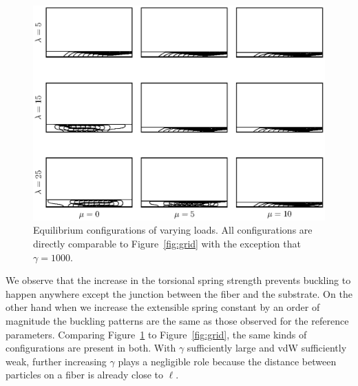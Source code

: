 	\begin{figure}
		\begin{center}
			\includegraphics[scale=1]{./fig/ch4/grid_g1000.eps}
		\end{center}		
		\caption{Equilibrium configurations of varying loads. All configurations are directly comparable to Figure~\ref{fig:grid} with the exception that $\gamma = 1000$.
		\label{fig:grid_g1000}}
	\end{figure}
	
	We observe that the increase in the torsional spring strength prevents buckling to happen anywhere except the junction between the fiber and the substrate. On the other hand when we increase the extensible spring constant by an order of magnitude the buckling patterns are the same as those observed for the reference parameters. Comparing Figure~\ref{fig:grid_g1000} to Figure~\ref{fig:grid}, the same kinds of configurations are present in both. With $\gamma$ sufficiently large and vdW sufficiently weak, further increasing $\gamma$ plays a negligible role because the distance between particles on a fiber is already close to $\ell$.
	
